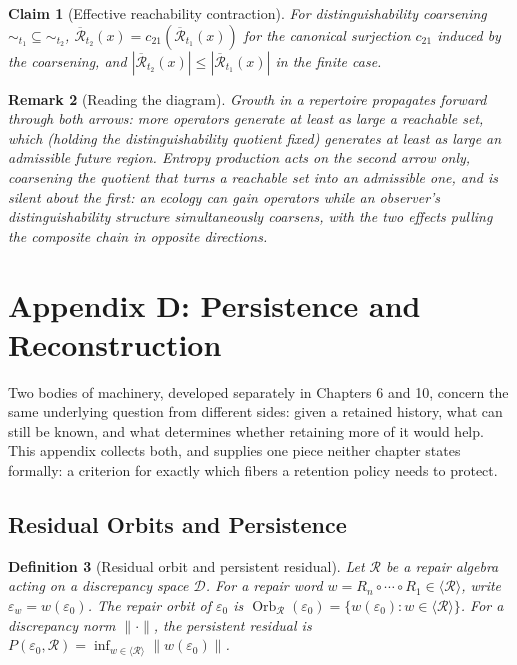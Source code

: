\documentclass[12pt]{report}
\newtheorem{definition}{Definition}[section]
\newtheorem{claim}[definition]{Claim}
\newtheorem{remark}[definition]{Remark}
\begin{document}
\begin{claim}[Effective reachability contraction]
For distinguishability coarsening $\sim_{t_1} \subseteq \sim_{t_2}$,
$\overline{\mathcal{R}}_{t_2}(x) = c_{21}(\overline{\mathcal{R}}_{t_1}(x))$
for the canonical surjection $c_{21}$ induced by the coarsening, and
$|\overline{\mathcal{R}}_{t_2}(x)| \leq |\overline{\mathcal{R}}_{t_1}(x)|$
in the finite case.
\end{claim}

\begin{remark}[Reading the diagram]
Growth in a repertoire propagates forward through both arrows: more
operators generate at least as large a reachable set, which (holding the
distinguishability quotient fixed) generates at least as large an
admissible future region. Entropy production acts on the second arrow
only, coarsening the quotient that turns a reachable set into an
admissible one, and is silent about the first: an ecology can gain
operators while an observer's distinguishability structure simultaneously
coarsens, with the two effects pulling the composite chain in opposite
directions.
\end{remark}

\chapter*{Appendix D: Persistence and Reconstruction}

Two bodies of machinery, developed separately in Chapters 6 and 10,
concern the same underlying question from different sides: given a
retained history, what can still be known, and what determines whether
retaining more of it would help. This appendix collects both, and
supplies one piece neither chapter states formally: a criterion for
exactly which fibers a retention policy needs to protect.

\section*{Residual Orbits and Persistence}

\begin{definition}[Residual orbit and persistent residual]
Let $\mathcal{R}$ be a repair algebra acting on a discrepancy space
$\mathcal{D}$. For a repair word $w = R_n \circ \cdots \circ R_1 \in
\langle \mathcal{R} \rangle$, write $\varepsilon_w = w(\varepsilon_0)$.
The repair orbit of $\varepsilon_0$ is $\operatorname{Orb}_\mathcal{R}(\varepsilon_0)
= \{w(\varepsilon_0) : w \in \langle\mathcal{R}\rangle\}$. For a
discrepancy norm $\|\cdot\|$, the persistent residual is
$P(\varepsilon_0,\mathcal{R}) = \inf_{w \in \langle\mathcal{R}\rangle}
\|w(\varepsilon_0)\|$.
\end{definition}
\end{document}
